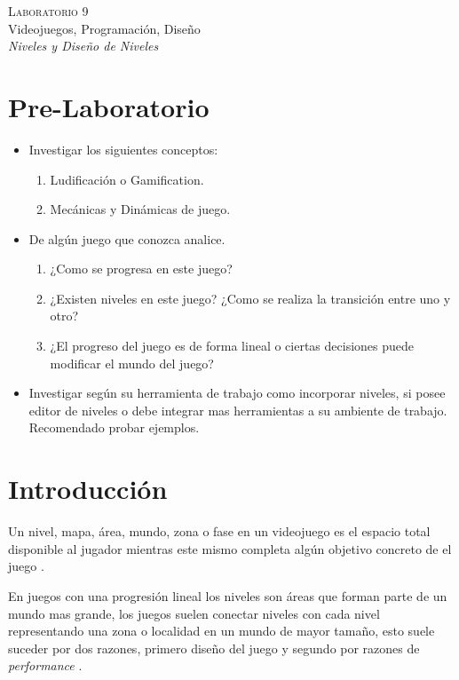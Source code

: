 \begin{center}
\textsc{\Large Laboratorio 9}~\\
{\large Videojuegos, Programación, Diseño}~\\
\emph{Niveles y Diseño de Niveles}
\end{center}

\section{Pre-Laboratorio}
\begin{itemize}
\item Investigar los siguientes conceptos:
\begin{enumerate}
  \item Ludificación o Gamification.
  \item Mecánicas y Dinámicas de juego.
\end{enumerate}
\item De algún juego que conozca analice.
\begin{enumerate}
  \item ¿Como se progresa en este juego?
  \item ¿Existen niveles en este juego? ¿Como se realiza la transición entre uno y otro?
  \item ¿El progreso del juego es de forma lineal o ciertas decisiones puede modificar el mundo del juego?
\end{enumerate}
\item Investigar según su herramienta de trabajo como incorporar niveles, si posee editor de niveles o debe integrar mas herramientas a su ambiente de trabajo. Recomendado probar ejemplos.
\end{itemize}

\section{Introducción}
Un nivel, mapa, área, mundo, zona o fase en un videojuego es el espacio total disponible al jugador  mientras este mismo completa algún objetivo concreto de el juego \cite[p.~107]{bobbatesgamedesign}.

En juegos con una progresión lineal los niveles son áreas que forman parte de un mundo mas grande, los juegos suelen conectar niveles con cada nivel representando una zona o localidad en un mundo de mayor tamaño, esto suele suceder por dos razones, primero diseño del juego y segundo por razones de \emph{performance} \cite[p.~104]{jenkinscreatinggames}.

